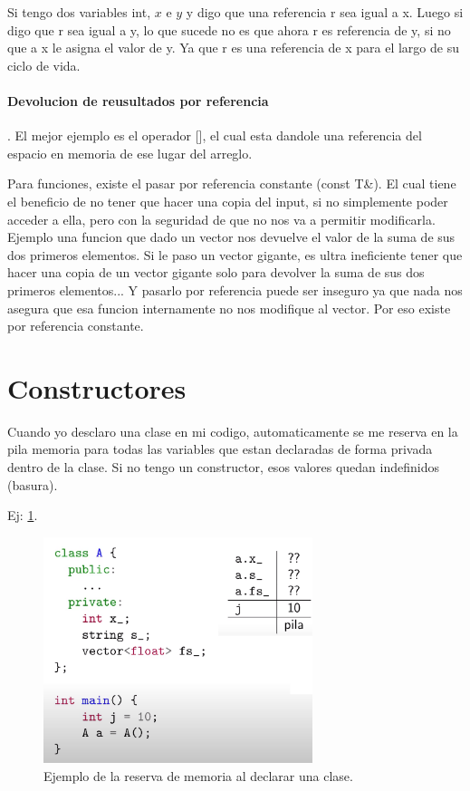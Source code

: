 \documentclass[11pt]{article}
\begin{document}
Si tengo dos variables int, $x$ e $y$ y digo que una referencia r sea igual a x.
Luego si digo que r sea igual a y, lo que sucede no es que ahora r es referencia de
y, si no que a x le asigna el valor de y. Ya que r es una referencia de x para el
largo de su ciclo de vida.

\paragraph{Devolucion de reusultados por referencia}.
El mejor ejemplo es el operador [], el cual esta dandole una referencia
del espacio en memoria de ese lugar del arreglo.
\vspace{0.5cm}

Para funciones, existe el pasar por referencia constante (const T\&).
El cual tiene el beneficio de no tener que hacer una copia del input, si no simplemente
poder acceder a ella, pero con la seguridad de que no nos va a permitir modificarla.
Ejemplo una funcion que dado un vector nos devuelve el valor de la suma de sus dos primeros
elementos.
Si le paso un vector gigante, es ultra ineficiente tener que hacer una copia de un
vector gigante solo para devolver la suma de sus dos primeros elementos...
Y pasarlo por referencia puede ser inseguro ya que nada nos asegura que esa funcion
internamente no nos modifique al vector.
Por eso existe por referencia constante.

\section{Constructores}
Cuando yo desclaro una clase en mi codigo, automaticamente se me reserva en la pila
memoria para todas las variables que estan declaradas de forma privada dentro de
la clase.
Si no tengo un constructor, esos valores quedan indefinidos (basura).

Ej: \ref{fig:const}.
\begin{figure}[h!]
    \centering
    \includegraphics[width=0.7\textwidth]{constructor.png}
    \caption{Ejemplo de la reserva de memoria al declarar una clase.}
    \label{fig:const}
\end{figure}
\end{document}
